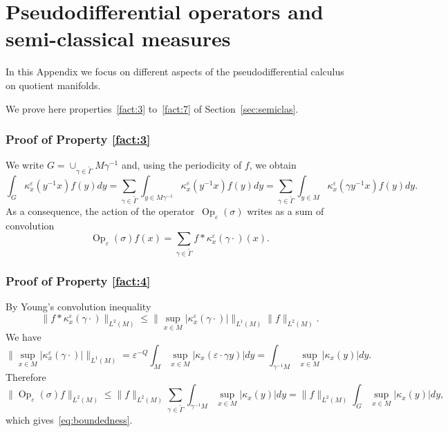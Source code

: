 \documentclass[JEP,XML,SOM,Unicode,published]{cedram}
\DeclareMathOperator{\Op}{Op}
\theoremstyle{plain}
\theoremstyle{definition}
\let\eps\varepsilon
\begin{document}
\section{Pseudodifferential operators and semi-classical measures}\label{sec:proofpseudo}

In this Appendix we focus on different aspects of the pseudodifferential calculus on quotient manifolds.


We prove here properties~\eqref{fact:3} to~\eqref{fact:7} of Section~\ref{sec:semiclas}.

\subsubsection*{Proof of Property \eqref{fact:3}}
We write
$G=\cup_{\gamma \in \widetilde{\Gamma}} M \gamma^{-1}$
and, using the periodicity of $f$, we obtain
\[
\int_{ G} \kappa_{ x}^\eps(y^{-1} x) f(y)dy=\sum_{\gamma\in \widetilde{\Gamma}} \int _{y\in M \gamma^{-1}} \kappa_{ x}^\eps(y^{-1} x) f(y)dy= \sum_{\gamma\in \widetilde{\Gamma}} \int _{y\in M } \kappa_{ x}^\eps(\gamma y^{-1} x) f(y)dy.
\]
As a consequence, the action of the operator~$\Op_\eps(\sigma)$ writes as a sum of convolution
\[
\Op_\eps(\sigma)f(x) = \sum_{\gamma\in \widetilde{\Gamma}} f*\kappa^\eps_{x}(\gamma\cdot) (x).
\]

\subsubsection*{Proof of Property \eqref{fact:4}}
By Young's convolution inequality
\[
\| f* \kappa^\eps_{x}(\gamma\cdot) \|_{L^2(M)}\leq \| \sup_{x\in M}| \kappa^\eps_{x}(\gamma\cdot) | \|_{L^1(M)} \| f\|_{L^2(M)}.
\]
We have
\[
\| \sup_{x\in M} | \kappa^\eps_{x}(\gamma\cdot)| \|_{L^1(M)}= \eps^{-Q}\int_M \sup_{x\in M} | \kappa_{x}(\eps\cdot \gamma y) |dy =\int_{\gamma^{-1}M}\sup_{x\in M} |\kappa_x(y)|dy.
\]
Therefore
\[
\| \Op_\eps(\sigma)f\|_{L^2(M)} \leq \| f\|_{L^2(M)} \sum_{\gamma\in \widetilde{\Gamma}} \int_{\gamma^{-1}M}\sup_{x\in M} |\kappa_x(y)|dy= \|f\|_{L^2(M)}\int_{G} \sup_{x\in M} |\kappa_x(y)|dy,
\]
which gives~\eqref{eq:boundedness}.
\end{document}
